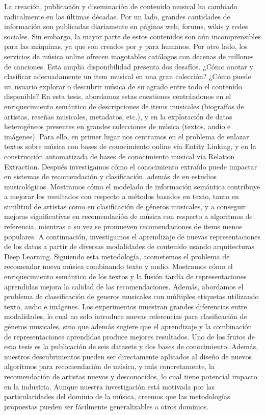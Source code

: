 La creación, publicación y diseminación de contenido musical ha cambiado radicalmente en las últimas décadas. Por un lado, grandes cantidades de información son publicadas diariamente en páginas web, forums, wikis y redes sociales. Sin embargo, la mayor parte de estos contenidos son aún incomprensibles para las máquinas, ya que son creados por y para humanos. Por otro lado, los servicios de música online ofrecen inagotables catálogos con decenas de millones de canciones. Esta amplia disponibilidad presenta dos desafíos. ¿Cómo anotar y clasificar adecuadamente un item musical en una gran colección? ¿Cómo puede un usuario explorar o descubrir música de su agrado entre todo el contenido disponible? En esta tesis, abordamos estas cuestiones centrándonos en el enriquecimiento semántico de descripciones de items musicales (biografías de artistas, reseñas musicales, metadatos, etc.), y en la exploración de datos heterogéneos presentes en grandes colecciones de música (textos, audio e imágenes). Para ello, en primer lugar nos centramos en el problema de enlazar textos sobre música con bases de conocimiento online vía Entity Linking, y en la construcción automatizada de bases de conocimiento musical vía Relation Extraction. Después investigamos cómo el conocimiento extraído puede impactar en sistemas de recomendación y clasificación, además de en estudios musicológicos. Mostramos cómo el modelado de información semántica contribuye a mejorar los resultados con respecto a métodos basados en texto, tanto en similitud de artistas como en clasificación de géneros musicales, y a conseguir mejoras significativas en recomendación de música con respecto a algoritmos de referencia, mientras a su vez se promueven recomendaciones de items menos populares. A continuación, investigamos el aprendizaje de nuevas representaciones de los datos a partir de diversas modalidades de contenido usando arquitecturas Deep Learning. Siguiendo esta metodología, acometemos el problema de recomendar nueva música combinando texto y audio. Mostramos cómo el enriquecimiento semántico de los textos y la fusión tardía de representaciones aprendidas mejora la calidad de las recomendaciones. Además, abordamos el problema de classificación de generos musicales con múltiples etiquetas utilizando texto, audio e imágenes. Los experimentos muestran grandes diferencias entre modalidades, lo cual no solo introduce nuevas referencias para clasificación de géneros musicales, sino que además sugiere que el aprendizaje y la combinación de representaciones aprendidas produce mejores resultados. Uno de los frutos de esta tesis es la publicación de seis datasets y dos bases de conocimiento. Además, nuestros descubrimentos pueden ser directamente aplicados al diseño de nuevos algoritmos para recomendación de música, y más concretamente, la recomendación de artistas nuevos y desconocidos, lo cual tiene potencial impacto en la industria. Aunque nuestra investigación está motivada por las particularidades del dominio de la música, creemos que las metodologías propuestas pueden ser fácilmente generalizables a otros dominios.